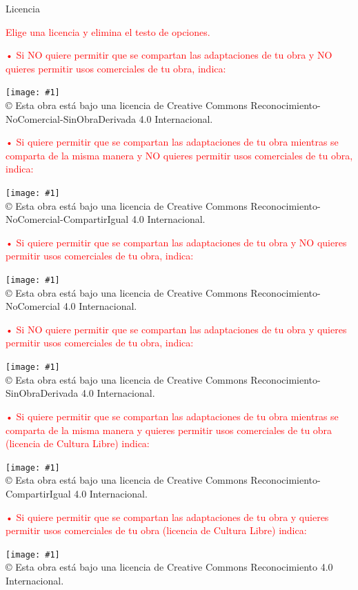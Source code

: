 \documentclass[a4paper,12pt,oneside]{scrbook}
\newcommand{\license}[2]{%
\begin{center}
    \begin{minipage}{0.8\textwidth}   
        \begin{center}
            \texttt{[image: \#1]}\\[12pt]
            {\Large #2}
        \end{center}
    \end{minipage}
\end{center}
}
\begin{document}
{\noindent\LARGE Licencia}
\vspace{15mm}

\textcolor{red}{Elige una licencia y elimina el testo de opciones.}
\bigskip

\textcolor{red}{• Si NO quiere permitir que se compartan las adaptaciones de tu obra y NO quieres permitir usos comerciales de tu obra, indica:}

\license{images/licenses/by-nc-nd.eu}{© Esta obra está bajo una licencia de Creative Commons Reconocimiento-NoComercial-SinObraDerivada 4.0 Internacional.}

\bigskip
\textcolor{red}{• Si quiere permitir que se compartan las adaptaciones de tu obra mientras se comparta de la misma manera y NO quieres permitir usos comerciales de tu obra, indica:}

\license{images/licenses/by-nc-sa.eu}{© Esta obra está bajo una licencia de Creative Commons Reconocimiento-NoComercial-CompartirIgual 4.0 Internacional.}
        
\bigskip
\textcolor{red}{• Si quiere permitir que se compartan las adaptaciones de tu obra y NO quieres permitir usos comerciales de tu obra, indica:}

\license{images/licenses/by-nc.eu}{© Esta obra está bajo una licencia de Creative Commons Reconocimiento-NoComercial 4.0 Internacional.}
    
\bigskip
\textcolor{red}{• Si NO quiere permitir que se compartan las adaptaciones de tu obra y quieres permitir usos comerciales de tu obra, indica:}

\license{images/licenses/by-nd}{© Esta obra está bajo una licencia de Creative Commons Reconocimiento-SinObraDerivada 4.0 Internacional.}

\bigskip
\textcolor{red}{• Si quiere permitir que se compartan las adaptaciones de tu obra mientras se comparta de la misma manera y quieres permitir usos comerciales de tu obra (licencia de Cultura Libre) indica:}

\license{images/licenses/by-sa}{© Esta obra está bajo una licencia de Creative Commons Reconocimiento-CompartirIgual 4.0 Internacional.}  

\bigskip
\textcolor{red}{• Si quiere permitir que se compartan las adaptaciones de tu obra y quieres permitir usos comerciales de tu obra (licencia de Cultura Libre) indica:}

\license{images/licenses/by}{© Esta obra está bajo una licencia de Creative Commons Reconocimiento 4.0 Internacional.}
\end{document}

